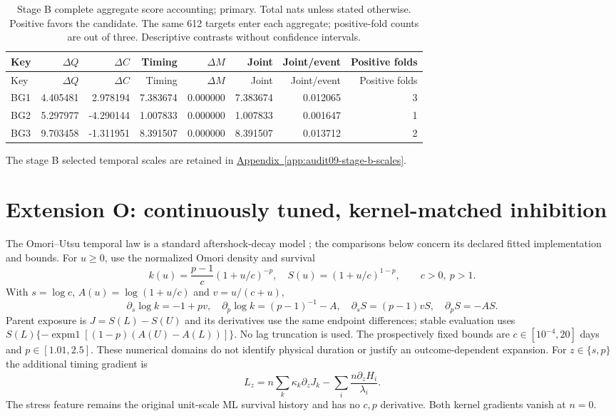 {\small
\setlength{\tabcolsep}{3pt}
\begin{longtable}{lrrrrrrr}
\caption{Stage B complete aggregate score accounting; primary. Total nats unless stated otherwise. Positive favors the candidate. The same 612 targets enter each aggregate; positive-fold counts are out of three. Descriptive contrasts without confidence intervals.}\label{tab:BG-primary}\\
\toprule
Key & $\Delta Q$ & $\Delta C$ & Timing & $\Delta M$ & Joint & Joint/event & Positive folds\\\midrule
\endfirsthead
\toprule
Key & $\Delta Q$ & $\Delta C$ & Timing & $\Delta M$ & Joint & Joint/event & Positive folds\\\midrule
\endhead
BG1 & 4.405481 & 2.978194 & 7.383674 & 0.000000 & 7.383674 & 0.012065 & 3\\
BG2 & 5.297977 & -4.290144 & 1.007833 & 0.000000 & 1.007833 & 0.001647 & 1\\
BG3 & 9.703458 & -1.311951 & 8.391507 & 0.000000 & 8.391507 & 0.013712 & 2\\
\bottomrule
\end{longtable}
}

\noindent The stage B selected temporal scales are retained in \hyperref[app:audit09-stage-b-scales]{Appendix~\ref{app:audit09-stage-b-scales}}.

\section{Extension O: continuously tuned, kernel-matched inhibition}

The Omori--Utsu temporal law is a standard aftershock-decay model \citep{Utsu1995}; the comparisons below concern its declared fitted implementation and bounds.
\label{sec:extension-o}
For $u\geq0$, use the normalized Omori density and survival
\[
 k(u)=\frac{p-1}{c}(1+u/c)^{-p},\quad
 S(u)=(1+u/c)^{1-p},\qquad c>0,\ p>1.
\]
With $s=\log c$, $A(u)=\log(1+u/c)$ and $v=u/(c+u)$,
\[
 \partial_s\log k=-1+pv,\quad
 \partial_p\log k=(p-1)^{-1}-A,\quad
 \partial_sS=(p-1)vS,\quad \partial_pS=-AS.
\]
Parent exposure is $J=S(L)-S(U)$ and its derivatives use the same endpoint
differences; stable evaluation uses $S(L)\{-\operatorname{expm1}[(1-p)
(A(U)-A(L))]\}$. No lag truncation is used. The prospectively fixed bounds
are $c\in[10^{-4},20]$ days and $p\in[1.01,2.5]$. These numerical domains
do not identify physical duration or justify an outcome-dependent expansion.
For $z\in\{s,p\}$ the additional timing gradient is
\[
 L_z=n\sum_k\kappa_k\partial_zJ_k
          -\sum_i\frac{n\partial_zH_i}{\lambda_i}.
\]
The stress feature remains the original unit-scale ML survival history and
has no $c,p$ derivative. Both kernel gradients vanish at $n=0$.

